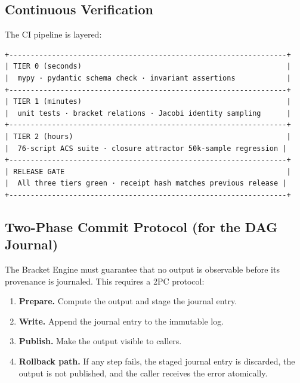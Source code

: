 \documentclass[11pt,a4paper]{article}
\providecommand{\tightlist}{\setlength{\itemsep}{0pt}\setlength{\parskip}{0pt}}
\begin{document}
\hypertarget{continuous-verification}{%
\subsection{Continuous Verification}\label{continuous-verification}}

The CI pipeline is layered:

\begin{Verbatim}[breaklines=true,breakanywhere=true]
+-----------------------------------------------------------------+
| TIER 0 (seconds)                                                |
|  mypy · pydantic schema check · invariant assertions            |
+-----------------------------------------------------------------+
| TIER 1 (minutes)                                                |
|  unit tests · bracket relations · Jacobi identity sampling      |
+-----------------------------------------------------------------+
| TIER 2 (hours)                                                  |
|  76-script ACS suite · closure attractor 50k-sample regression |
+-----------------------------------------------------------------+
| RELEASE GATE                                                    |
|  All three tiers green · receipt hash matches previous release |
+-----------------------------------------------------------------+
\end{Verbatim}

\hypertarget{two-phase-commit-protocol-for-the-dag-journal}{%
\subsection{Two-Phase Commit Protocol (for the DAG
Journal)}\label{two-phase-commit-protocol-for-the-dag-journal}}

The Bracket Engine must guarantee that no output is observable before
its provenance is journaled. This requires a 2PC protocol:

\begin{enumerate}
\def\labelenumi{\arabic{enumi}.}
\tightlist
\item
  \textbf{Prepare.} Compute the output and stage the journal entry.
\item
  \textbf{Write.} Append the journal entry to the immutable log.
\item
  \textbf{Publish.} Make the output visible to callers.
\item
  \textbf{Rollback path.} If any step fails, the staged journal entry is
  discarded, the output is not published, and the caller receives the
  error atomically.
\end{enumerate}
\end{document}
